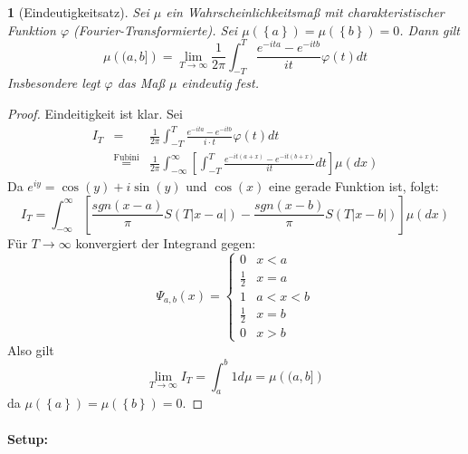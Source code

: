 \documentclass[10pt,a4paper]{report}
\numberwithin{equation}{section}
\numberwithin{figure}{section}
\theoremstyle{plain}
\theoremstyle{definition}
\theoremstyle{remark}
\theoremstyle{plain}
\newtheorem{prop}[thm]{\protect\propositionname}
\providecommand{\propositionname}{Satz}
\newcommand{\1}{ \mathbb{1} } %
\begin{document}
\begin{prop}[Eindeutigkeitsatz] 
  Sei $\mu$ ein Wahrscheinlichkeitsmaß mit charakteristischer Funktion
  $\varphi$ (Fourier-Transformierte). Sei $\mu\left(\left\{ a\right\} \right)=\mu\left(\left\{ b\right\} \right)=0$.
  Dann gilt
  \[
  \mu\left((a,b]\right)=\lim_{T\to\infty}\frac{1}{2\pi}\int_{-T}^{T}\frac{e^{-ita}-e^{-itb}}{it}\varphi\left(t\right)dt
  \]
  Insbesondere legt $\varphi$ das Maß $\mu$ eindeutig fest. 
\end{prop}
\begin{proof}
  Eindeitigkeit ist klar. Sei 
  \begin{eqnarray*}
    I_{T} & = & \frac{1}{2\pi}\int_{-T}^{T}\frac{e^{-ita}-e^{-itb}}{i\cdot t}\varphi(t)dt\\
    & \overset{\mbox{Fubini}}{=} & \frac{1}{2\pi}\int_{-\infty}^{\infty}\left[\int_{-T}^{T}\frac{e^{-it\left(a+x\right)}-e^{-it\left(b+x\right)}}{it}dt\right]\mu\left(dx\right)
  \end{eqnarray*}
  Da $e^{iy}=\cos\left(y\right)+i\sin\left(y\right)$ und $\cos\left(x\right)$
  eine gerade Funktion ist, folgt: 
  \[
  I_{T}=\int_{-\infty}^{\infty}\left[\frac{sgn\left(x-a\right)}{\pi}S\left(T\left|x-a\right|\right)-\frac{sgn\left(x-b\right)}{\pi}S\left(T\left|x-b\right|\right)\right]\mu\left(dx\right)
  \]
  Für $T\to\infty$ konvergiert der Integrand gegen: 
  \[
  \Psi_{a,b}\left(x\right)=\begin{cases}
    0 & x<a\\
    \frac{1}{2} & x=a\\
    1 & a<x<b\\
    \frac{1}{2} & x=b\\
    0 & x>b
  \end{cases}
  \]
  Also gilt 
  \[
  \lim_{T\to\infty}I_{T}=\int_{a}^{b}1d\mu=\mu\left((a,b]\right)
  \]
  da $\mu\left(\left\{ a\right\} \right)=\mu\left(\left\{ b\right\} \right)=0$. 
\end{proof}



\paragraph*{Setup:}
\end{document}
